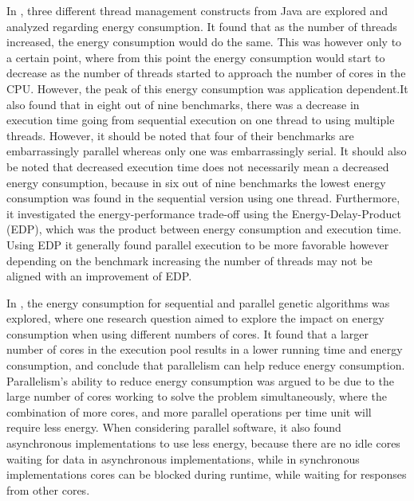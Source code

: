 In \cite{Pinto2014}, three different thread management constructs from Java are explored and analyzed regarding energy consumption. It found that as the number of threads increased, the energy consumption would do the same. This was however only to a certain point, where from this point the energy consumption would start to decrease as the number of threads started to approach the number of cores in the CPU. However, the peak of this energy consumption was application dependent.It also found that in eight out of nine benchmarks, there was a decrease in execution time going from sequential execution on one thread to using multiple threads. However, it should be noted that four of their benchmarks are embarrassingly parallel whereas only one was embarrassingly serial. It should also be noted that decreased execution time does not necessarily mean a decreased energy consumption, because in six out of nine benchmarks the lowest energy consumption was found in the sequential version using one thread. Furthermore, it investigated the energy-performance trade-off using the Energy-Delay-Product (EDP), which was the product between energy consumption and execution time. Using EDP it generally found parallel execution to be more favorable however depending on the benchmark increasing the number of threads may not be aligned with an improvement of EDP.\cite{Pinto2014}

In \cite{abdelhafez2019}, the energy consumption for sequential and parallel genetic algorithms was explored, where one research question aimed to explore the impact on energy consumption when using different numbers of cores. It found that a larger number of cores in the execution pool results in a lower running time and energy consumption, and conclude that parallelism can help reduce energy consumption. Parallelism's ability to reduce energy consumption was argued to be due to the large number of cores working to solve the problem simultaneously, where the combination of more cores, and more parallel operations per time unit will require less energy. When considering parallel software, it also found asynchronous implementations to use less energy, because there are no idle cores waiting for data in asynchronous implementations, while in synchronous implementations cores can be blocked during runtime, while waiting for responses from other cores.

